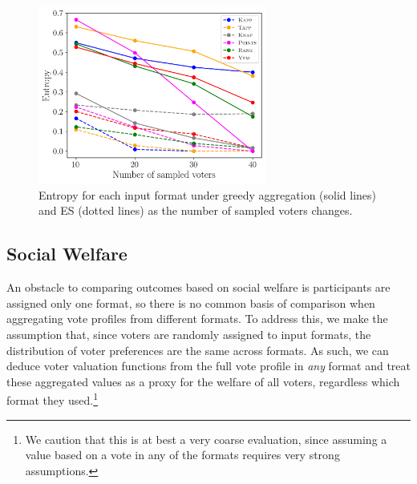 \documentclass[runningheads]{llncs}
\newcommand{\kibitz}[2]{\ifnum\Comments=1{\color{#1}{#2}}\fi}
\newcommand{\rf}[1]{\kibitz{blue}{[Roy says:#1]}}
\newcommand{\mes}{ES}
\begin{document}

\begin{figure}[!h]
\begin{center}
\includegraphics[width=7.5cm]{experiment/entropy_small_a.png}
\caption{Entropy for each input format under  greedy aggregation  (solid lines) and \mes{} (dotted lines)  as the number of sampled voters changes. }\label{fig:entropy}
\end{center}
\vspace{-3mm}
\end{figure}

\subsection{Social Welfare}
An obstacle to comparing outcomes based on social welfare is participants are assigned only one format, so there is no common basis of comparison when aggregating vote profiles from different formats. To address this, we make the assumption that, since voters are randomly assigned to input formats, the distribution of voter preferences are the same across formats. As such, we can deduce voter valuation functions from the full vote profile in \emph{any} format and treat these aggregated values as a proxy for the welfare of all voters, regardless which format they used.\footnote{ We caution that this is at best a very coarse evaluation, since assuming a value based on  a vote in any of the formats requires very strong assumptions. %
} %
\end{document}
